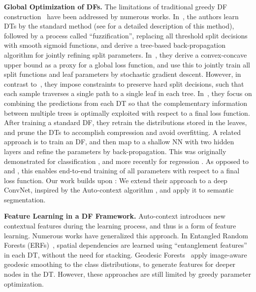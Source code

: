 \documentclass[twocolumn]{svjour3}
\begin{document}
\textbf{Global Optimization of DFs.} The limitations of traditional greedy DF construction~\cite{breiman_2001} have been addressed by numerous works.
In~\cite{SuarezL99}, the authors learn DTs by the standard method (see \cite{Criminisi:2013us} for a detailed description of this method), followed by a process called ``fuzzification'', replacing all threshold split decisions with smooth sigmoid functions, and derive a tree-based back-propagation algorithm for jointly refining split parameters.
In~\cite{Norouzi}, they derive a convex-concave upper bound as a proxy for a global loss function, and use this to jointly train all split functions and leaf parameters by stochastic gradient descent.  However, in contrast to~\cite{SuarezL99}, they impose constraints to preserve hard split decisions, such that each sample traverses a single path to a single leaf in each tree.
%
In~\cite{shaoqing15grrf}, they focus on combining the predictions from each DT so that the complementary information between multiple trees is optimally exploited with respect to a final loss function.
After training a standard DF, they retrain the distributions stored in the leaves, and prune the DTs to accomplish compression and avoid overfitting.
A related approach is to train an DF, and then map to a shallow NN with two hidden layers and refine the parameters by back-propagation. 
This was originally demonstrated for classification \cite{Sethi1990,Welbl14}, and more recently for regression \cite{welbl:regression}.
As opposed to \cite{SuarezL99} and \cite{shaoqing15grrf}, this enables end-to-end training of all parameters with respect to a final loss function.
Our work builds upon \cite{Sethi1990,Welbl14}: We extend their approach to a deep ConvNet, inspired by the Auto-context algorithm \cite{Tu2010}, and apply it to semantic segmentation.

\textbf{Feature Learning in a DF Framework.}
Auto-context introduces new contextual features during the learning process, and thus is a form of feature learning.
Numerous works have generalized this approach.
In Entangled Random Forests (ERFs)~\cite{ERFs}, spatial dependencies are learned using ``entanglement features'' in each DT, without the need for stacking.
Geodesic Forests~\cite{KontschiederKSC13} apply image-aware geodesic smoothing to the class distributions, to generate features for deeper nodes in the DT.
However, 
these approaches are still limited by greedy parameter optimization.
\end{document}
